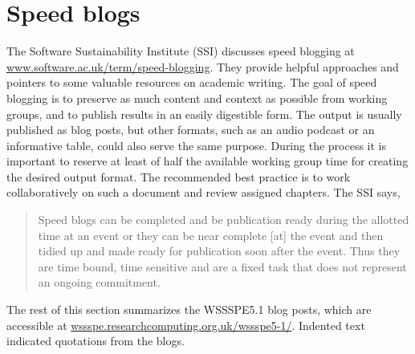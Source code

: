 \documentclass[11pt,letterpaper]{article}
\newcommand{\note}[1]{ {\textcolor{blueish}        { ***Note: #1 }}}
\begin{document}
\section{Speed blogs} \label{sec:speed_blogs}



The Software Sustainability Institute (SSI) discusses speed blogging at \href{https://www.software.ac.uk/term/speed-blogging}{www.software.ac.uk/term/speed-blogging}. They provide helpful approaches and pointers to some valuable resources on academic writing.
%
The goal of speed blogging is to preserve as much content and context as possible from working groups, and to publish results in an easily digestible form. The output is usually published as blog posts, but other formats, such as an audio podcast or an informative table, could also serve the same purpose. During the process it is important to reserve at least of half the available working group time for creating the desired output format. The recommended best practice is to work collaboratively on such a document and review assigned chapters.
The SSI says,
\begin{quotation}
Speed blogs can be completed and be publication ready during the allotted time at an event or they can be near complete [at] the event and then tidied up and made ready for publication soon after the event. Thus they are time bound, time sensitive and are a fixed task that does not represent an ongoing commitment.
\end{quotation}


The rest of this section summarizes the WSSSPE5.1 blog posts, which are accessible at \href{http://wssspe.researchcomputing.org.uk/wssspe5-1/}{wssspe.researchcomputing.org.uk/wssspe5-1/}. Indented text indicated quotations from the blogs.
\end{document}
